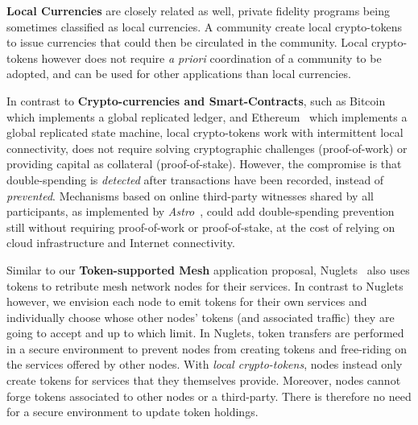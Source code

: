 \documentclass[sigplan,screen,10pt]{acmart}
\newcommand\ssbtokens[0]{\textit{SSB-Tokens} }
\begin{document}
\textbf{Local Currencies} are closely related as well, private fidelity programs being sometimes classified as local currencies. A community create local crypto-tokens to issue currencies that could then be circulated in the community. Local crypto-tokens however does not require \textit{a priori} coordination of a community to be adopted, and can be used for other applications than local currencies.

In contrast to \textbf{Crypto-currencies and Smart-Contracts}, such as Bitcoin~\cite{nakamoto2008bitcoin} which implements a global replicated ledger, and Ethereum~\cite{buterin2014next} which implements a global replicated state machine, local crypto-tokens work with intermittent local connectivity, does not require solving cryptographic challenges (proof-of-work) or providing capital as collateral (proof-of-stake). However, the compromise is that double-spending is \textit{detected} after transactions have been recorded, instead of \textit{prevented}. Mechanisms based on online third-party witnesses shared by all participants, as implemented by \textit{Astro}~\cite{collins2020online}, could add double-spending prevention still without requiring proof-of-work or proof-of-stake, at the cost of relying on cloud infrastructure and Internet connectivity.


Similar to our \textbf{Token-supported Mesh} application proposal, Nuglets~\cite{buttyan2001nuglets} also uses tokens to retribute mesh network nodes for their services. In contrast to Nuglets however, we envision each node to emit tokens for their own services and individually choose whose other nodes' tokens (and associated traffic) they are going to accept and up to which limit. In Nuglets, token transfers are performed in a secure environment to prevent nodes from creating tokens and free-riding on the services offered by other nodes. With \textit{local crypto-tokens}, nodes instead only create tokens for services that they themselves provide. Moreover, nodes cannot forge tokens associated to other nodes or a third-party. There is therefore no need for a secure environment to update token holdings. 
\end{document}
